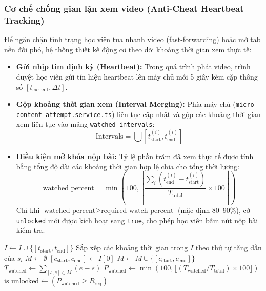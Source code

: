 \subsubsection{Cơ chế chống gian lận xem video (Anti-Cheat Heartbeat Tracking)}
Để ngăn chặn tình trạng học viên tua nhanh video (fast-forwarding) hoặc mở tab
nền đối phó, hệ thống thiết kế động cơ theo dõi khoảng thời gian xem thực tế:
\begin{itemize}
    \item \textbf{Gửi nhịp tim định kỳ (Heartbeat):} Trong quá trình phát video,
          trình duyệt học viên gửi tín hiệu heartbeat lên máy chủ mỗi 5 giây
          kèm cặp thông số $[t_{\text{current}}, \Delta t]$.
    \item \textbf{Gộp khoảng thời gian xem (Interval Merging):} Phía máy chủ
          (\texttt{micro-content-attempt.service.ts}) liên tục cập nhật và gộp
          các khoảng thời gian xem liên tục vào mảng \texttt{watched\_intervals}:
          $$\text{Intervals} = \bigcup [t_{\text{start}}^{(i)}, t_{\text{end}}^{(i)}]$$
    \item \textbf{Điều kiện mở khóa nộp bài:} Tỷ lệ phần trăm đã xem thực tế được
          tính bằng tổng độ dài các khoảng thời gian hợp lệ chia cho tổng thời lượng:
          $$\text{watched\_percent} = \min\left(100, \left\lfloor \frac{\sum_{i} (t_{\text{end}}^{(i)} - t_{\text{start}}^{(i)})}{T_{\text{total}}} \times 100 \right\rfloor \right)$$
          Chỉ khi $\text{watched\_percent} \ge \text{required\_watch\_percent}$ (mặc định 80--90\%),
          cờ \texttt{unlocked} mới được kích hoạt sang \texttt{true}, cho phép học viên
          bấm nút nộp bài kiểm tra.
\end{itemize}

\begin{algorithm}[H]
\SetAlgoLined
{}
\BlankLine
$I \leftarrow I \cup \{[t_{\text{start}}, t_{\text{end}}]\}$\;
Sắp xếp các khoảng thời gian trong $I$ theo thứ tự tăng dần của $s_i$\;
$M \leftarrow \emptyset$\;
$[c_{\text{start}}, c_{\text{end}}] \leftarrow I[0]$\;
$M \leftarrow M \cup \{[c_{\text{start}}, c_{\text{end}}]\}$\;
$T_{\text{watched}} \leftarrow \sum_{[s, e] \in M} (e - s)$\;
$P_{\text{watched}} \leftarrow \min(100, \lfloor (T_{\text{watched}} / T_{\text{total}}) \times 100 \rfloor)$\;
$\text{is\_unlocked} \leftarrow (P_{\text{watched}} \ge R_{\text{req}})$\;
\;
\caption{Thuật toán gộp khoảng thời gian xem và xác thực mở khóa nộp bài.}
\label{algo:heartbeat-merging}
\end{algorithm}

